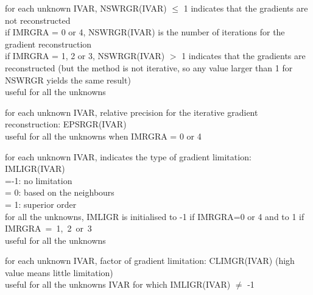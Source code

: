 {for each unknown IVAR, NSWRGR(IVAR) $\leqslant$ 1 indicates that the
gradients are not reconstructed\\ 
\hspace*{1.3cm}if IMRGRA = 0 or 4, NSWRGR(IVAR) is the number of
iterations for the gradient reconstruction\\
\hspace*{1.3cm}if IMRGRA = 1, 2 or 3, NSWRGR(IVAR) $>$ 1 indicates that
the gradients are reconstructed (but the method is not iterative, so any value
larger than 1 for NSWRGR yields the same result)\\ 
useful for all the unknowns}

{for each unknown IVAR, relative precision for the iterative gradient
reconstruction: EPSRGR(IVAR)\\
useful for all the unknowns when IMRGRA = 0 or 4}

{for each unknown IVAR, indicates the type of gradient limitation:
IMLIGR(IVAR)\\
\hspace*{1.3cm}=-1: no limitation\\
\hspace*{1.3cm}= 0: based on the neighbours\\
\hspace*{1.3cm}= 1: superior order\\
for all the unknowns, IMLIGR is initialised to -1 if IMRGRA=0 or 4 and to 1 if 
\mbox{IMRGRA = 1, 2 or 3}\\ 
useful for all the unknowns}

{for each unknown IVAR, factor of gradient limitation: CLIMGR(IVAR) (high
value means little limitation)\\
useful for all the unknowns IVAR for which IMLIGR(IVAR) $\ne$ -1}

